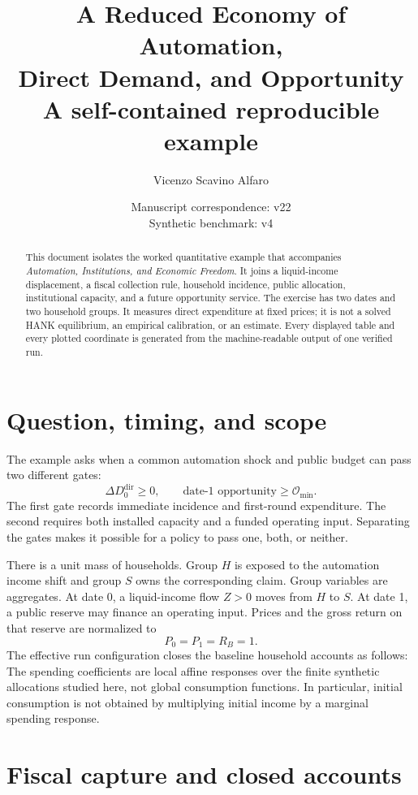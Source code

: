 \documentclass[11pt]{article}
\title{\textbf{A Reduced Economy of Automation,\\Direct Demand, and Opportunity}\\[0.5em]
\large A self-contained reproducible example}
\author{Vicenzo Scavino Alfaro}
\date{Manuscript correspondence: v22\\Synthetic benchmark: v4}
\newcommand{\OO}{\mathcal O}
\begin{document}
\maketitle

\begin{abstract}
This document isolates the worked quantitative example that accompanies
\emph{Automation, Institutions, and Economic Freedom}. It joins a liquid-income
displacement, a fiscal collection rule, household incidence, public allocation,
institutional capacity, and a future opportunity service. The exercise has two
dates and two household groups. It measures direct expenditure at fixed prices;
it is not a solved HANK equilibrium, an empirical calibration, or an estimate.
Every displayed table and every plotted coordinate is generated from the
machine-readable output of one verified run.
\end{abstract}

\clearpage
\begingroup
\setlength{\parskip}{0pt}
\tableofcontents
\endgroup
\clearpage

\section{Question, timing, and scope}

The example asks when a common automation shock and public budget can pass two
different gates:
\[
\Delta D_0^{\mathrm{dir}}\geq 0,
\qquad
\text{date-1 opportunity}\geq \OO_{\min}.
\]
The first gate records immediate incidence and first-round expenditure. The
second requires both installed capacity and a funded operating input. Separating
the gates makes it possible for a policy to pass one, both, or neither.

There is a unit mass of households. Group $H$ is exposed to the automation
income shift and group $S$ owns the corresponding claim. Group variables are
aggregates. At date 0, a liquid-income flow $Z>0$ moves from $H$ to $S$.
At date 1, a public reserve may finance an operating input. Prices and the gross
return on that reserve are normalized to
\[
P_0=P_1=R_B=1.
\]
The effective run configuration closes the baseline household accounts as
follows:
\[

\]
The spending coefficients are local affine responses over the finite synthetic
allocations studied here, not global consumption functions. In particular,
initial consumption is not obtained by multiplying initial income by a marginal
spending response.

\section{Fiscal capture and closed accounts}
\end{document}
